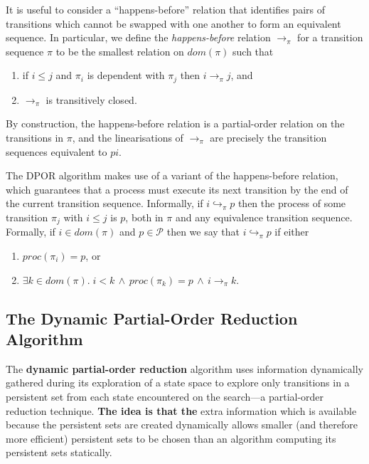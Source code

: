 \documentclass[12pt,a4paper,twoside,openright]{report}
\begin{document}
It is useful to consider a
``happens-before'' relation that identifies
pairs of transitions which
cannot be swapped with one another
to form an equivalent sequence.
In particular, we define the \emph{happens-before}
relation $\longrightarrow_\pi$ for a transition
sequence $\pi$ to be the smallest relation on
$\textit{dom}(\pi)$ such that
\begin{enumerate}
	\item if $i \leq j$ and $\pi_i$ is dependent with
		$\pi_j$ then $i \longrightarrow_\pi j$, and
	\item $\longrightarrow_\pi$ is transitively closed.
\end{enumerate}
By construction, the happens-before relation is a
partial-order relation on the transitions in $\pi$,
and the linearisations of $\longrightarrow_\pi$
are precisely the transition sequences equivalent
to $pi$.

The DPOR algorithm makes use of a variant of the
happens-before relation, which guarantees that a
process must execute its next transition by the
end of the current transition sequence.
Informally, if $i \hookrightarrow_\pi p$ then
the process of some transition $\pi_j$ with $i \leq j$
is $p$, both in $\pi$ and any
equivalence transition sequence.
Formally, 
if $i \in \textit{dom}(\pi)$ and $p \in
\mathcal{P}$ then we
say that $i \hookrightarrow_\pi p$ if
either
\begin{enumerate}
	\item $\textit{proc}(\pi_i) = p$, or
	\item $\exists k \in \textit{dom}(\pi).\;
	i < k \,\wedge\, \textit{proc}(\pi_k) = p
	\,\wedge\, i \longrightarrow_\pi k $.
\end{enumerate}


\subsection{The Dynamic Partial-Order Reduction Algorithm}

The \textbf{dynamic partial-order reduction} algorithm
uses information dynamically gathered during its
exploration of a state space to explore only
transitions in a persistent set from each state
encountered on the search---a partial-order
reduction technique. \textbf{The idea is that the}
extra information which is available because
the persistent sets are created dynamically
allows smaller (and therefore more efficient)
persistent sets to be chosen than an algorithm
computing its persistent sets statically.
\end{document}
